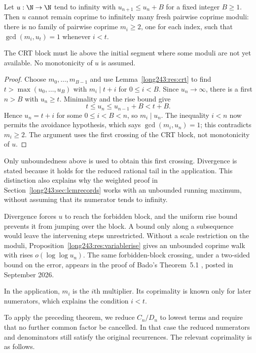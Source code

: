 \begin{theorem}\label{long243:res:barrier}
Let $u:\N\to\N$ tend to infinity with $u_{n+1}\le u_n+B$ for a fixed integer $B\ge1$.
Then $u$ cannot remain coprime to infinitely many fresh pairwise coprime
moduli: there is no family of pairwise coprime $m_i\ge2$, one for each index,
such that $\gcd(m_i,u_t)=1$ whenever $i<t$.
\end{theorem}

The CRT block must lie above the initial segment where some moduli
are not yet available. No monotonicity of $u$ is assumed.

\begin{proof}
Choose $m_0,\ldots,m_{B-1}$ and use Lemma~\ref{long243:res:crt} to find
$t>\max(u_0,\ldots,u_B)$ with $m_i\mid t+i$ for $0\le i<B$.  Since
$u_n\to\infty$, there is a first $n>B$ with $u_n\ge t$.  Minimality and the
rise bound give
\[
 t\le u_n\le u_{n-1}+B<t+B.
\]
Hence $u_n=t+i$ for some $0\le i<B<n$, so $m_i\mid u_n$.  The inequality
$i<n$ now permits the avoidance hypothesis, which says
$\gcd(m_i,u_n)=1$; this contradicts $m_i\ge2$.  The argument uses the first
crossing of the CRT block, not monotonicity of $u$.
\end{proof}

Only unboundedness above is used to obtain this first crossing.
Divergence is stated because it holds for the reduced rational tail in
the application. This distinction also explains why the weighted proof
in Section~\ref{long243:sec:lcmrecords} works with an unbounded running
maximum, without assuming that its numerator tends to infinity.


Divergence forces $u$ to reach the forbidden block, and the uniform rise
bound prevents it from jumping over the block. A bound only along a
subsequence would leave the intervening steps unrestricted. Without a scale restriction on the moduli,
Proposition~\ref{long243:res:variablerise} gives an unbounded coprime walk
with rises $o(\log\log u_n)$.  The same forbidden-block crossing,
under a two-sided bound on the error, appears in the proof of Bado's
Theorem~5.1 \cite[pp.~4--5]{bado2026}, posted in September 2026.

In the application, $m_i$ is the $i$th multiplier. Its coprimality is
known only for later numerators, which explains the condition $i<t$.

To apply the preceding theorem, we reduce $C_n/D_n$ to lowest terms
and require that no further common factor be cancelled. In that case
the reduced numerators and denominators still satisfy the original
recurrences. The relevant coprimality is as follows.

